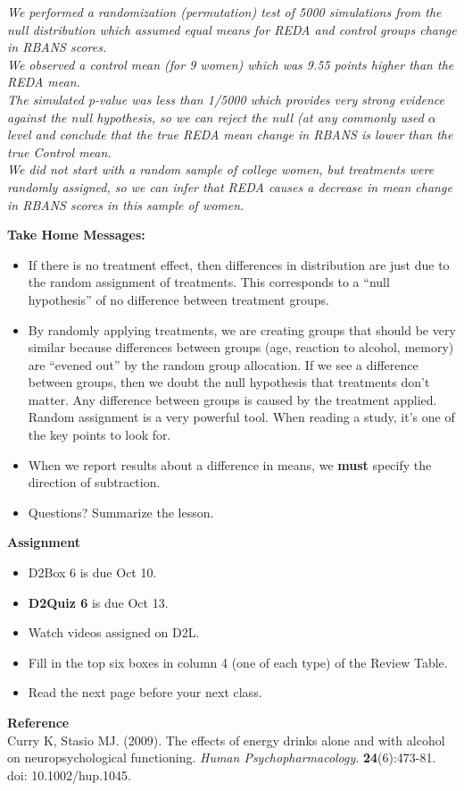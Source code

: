 \begin{enumerate}
\begin{key}
  {\it 
We performed a randomization (permutation) test of 5000 simulations
from the null distribution which assumed equal means for REDA and
control groups change in RBANS scores.\\
We observed a control mean (for 9 women) which was 9.55 points higher
than the REDA mean.\\
The simulated p-value was less than 1/5000 which provides very strong
evidence against the null hypothesis, so we can reject the null (at
any commonly used $\alpha$ level and conclude that the true REDA mean
change in RBANS is lower than the true Control mean.\\
We did not start with a random sample of college women, but treatments
were randomly assigned, so we can infer that REDA causes a decrease in
mean change in RBANS scores in this sample of women.
}
\end{key}


 \end{enumerate}


{\sf\bf Take Home Messages:}
\begin{itemize}
  \item 
  If there is no treatment effect, then differences in distribution
  are just due to the random assignment of treatments.  This
  corresponds to a ``null hypothesis'' of no difference between
  treatment groups.
\item  By randomly applying treatments, we are creating groups that
  should be very similar because differences between groups (age,
  reaction to alcohol, memory) are “evened out” by the random group
  allocation. If we see a difference between groups, then we doubt the
  null hypothesis that treatments don't matter.  Any difference
  between groups is caused by the treatment applied.  Random
  assignment is a very powerful tool.  When reading a study, it's one
  of the key points to look for. 
 \item When we report results about a difference in means, we {\bf
     must} specify the direction of subtraction. 
 \item 
  Questions? Summarize  the  lesson. \vfill

\end{itemize}



\noindent
{\bf Assignment} \vspace{-.2in}
\begin{itemize}
\item D2Box 6 is due Oct 10.
\item {\bf D2Quiz 6} is due Oct 13.
\item Watch videos assigned on D2L.
\item Fill in the top six  boxes in column 4 (one  of each type) of
  the Review Table.   
\item Read the next page before your next class.
\end{itemize}


{\sf\bf Reference}
\\
 Curry K, Stasio MJ.  (2009). The effects of energy drinks alone and with
 alcohol on neuropsychological functioning. {\it Human  Psychopharmacology}.
{\bf 24}(6):473-81. doi: 10.1002/hup.1045. 


